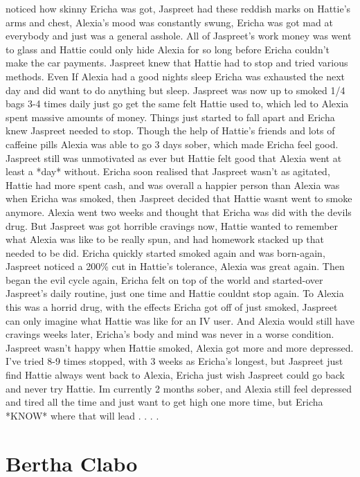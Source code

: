 \documentclass[12pt]{book}
\begin{document}
noticed how skinny Ericha was got, Jaspreet had these reddish marks on Hattie's arms and chest, Alexia's mood was constantly swung, Ericha was got mad at everybody and just was a general asshole. All of Jaspreet's work money was went to glass and Hattie could only hide Alexia for so long before Ericha couldn't make the car payments. Jaspreet knew that Hattie had to stop and tried various methods. Even If Alexia had a good nights sleep Ericha was exhausted the next day and did want to do anything but sleep. Jaspreet was now up to smoked 1/4 bags 3-4 times daily just go get the same felt Hattie used to, which led to Alexia spent massive amounts of money. Things just started to fall apart and Ericha knew Jaspreet needed to stop. Though the help of Hattie's friends and lots of caffeine pills Alexia was able to go 3 days sober, which made Ericha feel good. Jaspreet still was unmotivated as ever but Hattie felt good that Alexia went at least a *day* without. Ericha soon realised that Jaspreet wasn't as agitated, Hattie had more spent cash, and was overall a happier person than Alexia was when Ericha was smoked, then Jaspreet decided that Hattie wasnt went to smoke anymore. Alexia went two weeks and thought that Ericha was did with the devils drug. But Jaspreet was got horrible cravings now, Hattie wanted to remember what Alexia was like to be really spun, and had homework stacked up that needed to be did. Ericha quickly started smoked again and was born-again, Jaspreet noticed a 200\% cut in Hattie's tolerance, Alexia was great again. Then began the evil cycle again, Ericha felt on top of the world and started-over Jaspreet's daily routine, just one time and Hattie couldnt stop again. To Alexia this was a horrid drug, with the effects Ericha got off of just smoked, Jaspreet can only imagine what Hattie was like for an IV user. And Alexia would still have cravings weeks later, Ericha's body and mind was never in a worse condition. Jaspreet wasn't happy when Hattie smoked, Alexia got more and more depressed. I've tried 8-9 times stopped, with 3 weeks as Ericha's longest, but Jaspreet just find Hattie always went back to Alexia, Ericha just wish Jaspreet could go back and never try Hattie. Im currently 2 months sober, and Alexia still feel depressed and tired all the time and just want to get high one more time, but Ericha *KNOW* where that will lead . . .  .






\chapter{Bertha Clabo}
\end{document}
